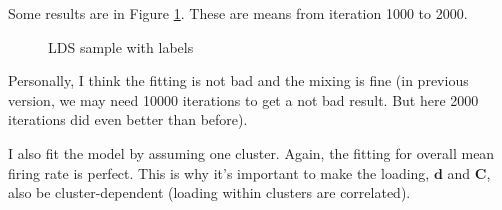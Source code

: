 \documentclass[]{article}
\begin{document}
Some results are in Figure \ref{fig:LDS labeled}. These are means from iteration 1000 to 2000.

\begin{figure}[h!]
	\caption{LDS sample with labels}
	\label{fig:LDS labeled}
\end{figure}

Personally, I think the fitting is not bad and the mixing is fine (in previous version, we may need 10000 iterations to get a not bad result. But here 2000 iterations did even better than before).

I also fit the model by assuming one cluster. Again, the fitting for overall mean firing rate is perfect. This is why it's important to make the loading, \(\mathbf{d}\) and \(\mathbf{C}\), also be cluster-dependent (loading within clusters are correlated).
\end{document}
